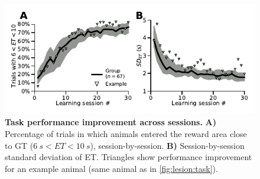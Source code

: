 \begin{figure}[h!]
	\begin{center}
		\includegraphics[scale=1]{ch-appendicies/figures/CorrectTrialCurve.pdf}
		\caption[Task Performance Improvement]
		{\textbf{Task performance improvement across sessions.}
		\textbf{A)} Percentage of trials in which animals entered the reward area close to GT ($6~s<ET<10~s$), session-by-session.
		\textbf{B)} Session-by-session standard deviation of ET.
		Triangles show performance improvement for an example animal (same animal as in \autoref{fig:lesion:task}).
		}
		\label{fig:appendix:CorrectTrialCurve}
	\end{center}
\end{figure}